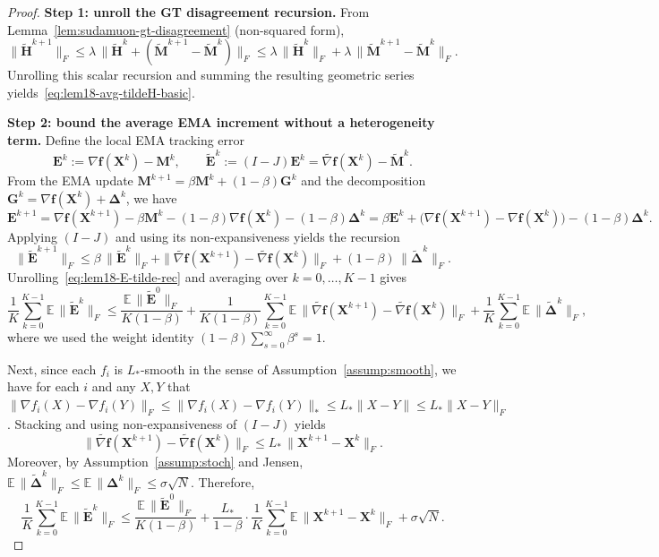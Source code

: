 \documentclass{article}
\begin{document}
\begin{proof}
\medskip\noindent\textbf{Step 1: unroll the GT disagreement recursion.}
From Lemma~\ref{lem:sudamuon-gt-disagreement} (non-squared form),
\[
\|\tilde{\mathbf H}^{k+1}\|_F
\le \lambda\,\|\tilde{\mathbf H}^{k} + (\tilde{\mathbf M}^{k+1}-\tilde{\mathbf M}^{k})\|_F
\le \lambda\,\|\tilde{\mathbf H}^{k}\|_F+\lambda\,\|\tilde{\mathbf M}^{k+1}-\tilde{\mathbf M}^{k}\|_F.
\]
Unrolling this scalar recursion and summing the resulting geometric series yields~\eqref{eq:lem18-avg-tildeH-basic}.

\medskip\noindent\textbf{Step 2: bound the average EMA increment without a heterogeneity term.}
Define the local EMA tracking error
\[
\mathbf E^k := \nabla \mathbf f(\mathbf X^k)-\mathbf M^k,
\qquad \tilde{\mathbf E}^k := (I-J)\mathbf E^k=\widetilde{\nabla \mathbf f}(\mathbf X^k)-\tilde{\mathbf M}^k.
\]
From the EMA update $\mathbf M^{k+1}=\beta\mathbf M^k+(1-\beta)\mathbf G^k$ and the decomposition
$\mathbf G^k=\nabla \mathbf f(\mathbf X^k)+\mathbf\Delta^k$, we have
\[
\mathbf E^{k+1}
=\nabla \mathbf f(\mathbf X^{k+1})-\beta\mathbf M^k-(1-\beta)\nabla \mathbf f(\mathbf X^k)-(1-\beta)\mathbf\Delta^k
=\beta\mathbf E^k+\big(\nabla \mathbf f(\mathbf X^{k+1})-\nabla \mathbf f(\mathbf X^k)\big)-(1-\beta)\mathbf\Delta^k.
\]
Applying $(I-J)$ and using its non-expansiveness yields the recursion
\begin{equation}
\label{eq:lem18-E-tilde-rec}
\|\tilde{\mathbf E}^{k+1}\|_F
\le \beta\,\|\tilde{\mathbf E}^{k}\|_F
+\|\widetilde{\nabla \mathbf f}(\mathbf X^{k+1})-\widetilde{\nabla \mathbf f}(\mathbf X^k)\|_F
+(1-\beta)\,\|\tilde{\mathbf\Delta}^k\|_F.
\end{equation}
Unrolling~\eqref{eq:lem18-E-tilde-rec} and averaging over $k=0,\dots,K-1$ gives
\[
\frac{1}{K}\sum_{k=0}^{K-1}\mathbb{E}\,\|\tilde{\mathbf E}^{k}\|_F
\le \frac{\mathbb{E}\,\|\tilde{\mathbf E}^{0}\|_F}{K(1-\beta)}
+\frac{1}{K(1-\beta)}\sum_{k=0}^{K-1}\mathbb{E}\,\|\widetilde{\nabla \mathbf f}(\mathbf X^{k+1})-\widetilde{\nabla \mathbf f}(\mathbf X^k)\|_F
+\frac{1}{K}\sum_{k=0}^{K-1}\mathbb{E}\,\|\tilde{\mathbf\Delta}^k\|_F,
\]
where we used the weight identity
$(1-\beta)\sum_{s=0}^{\infty}\beta^s=1$.

Next, since each $f_i$ is $L_*$-smooth in the sense of Assumption~\ref{assump:smooth}, we have for each $i$ and any $X,Y$ that
$\|\nabla f_i(X)-\nabla f_i(Y)\|_F\le \|\nabla f_i(X)-\nabla f_i(Y)\|_*\le L_*\|X-Y\|\le L_*\|X-Y\|_F$.
Stacking and using non-expansiveness of $(I-J)$ yields
\[
\|\widetilde{\nabla \mathbf f}(\mathbf X^{k+1})-\widetilde{\nabla \mathbf f}(\mathbf X^k)\|_F
\le L_*\,\|\mathbf X^{k+1}-\mathbf X^k\|_F.
\]
Moreover, by Assumption~\ref{assump:stoch} and Jensen,
$\mathbb{E}\,\|\tilde{\mathbf\Delta}^k\|_F\le \mathbb{E}\,\|\mathbf\Delta^k\|_F\le \sigma\sqrt N$.
Therefore,
\begin{equation}
\label{eq:lem18-avg-Etilde}
\frac{1}{K}\sum_{k=0}^{K-1}\mathbb{E}\,\|\tilde{\mathbf E}^{k}\|_F
\le \frac{\mathbb{E}\,\|\tilde{\mathbf E}^{0}\|_F}{K(1-\beta)}
+\frac{L_*}{1-\beta}\cdot\frac{1}{K}\sum_{k=0}^{K-1}\mathbb{E}\,\|\mathbf X^{k+1}-\mathbf X^k\|_F
+\sigma\sqrt N.
\end{equation}


\end{proof}
\end{document}
